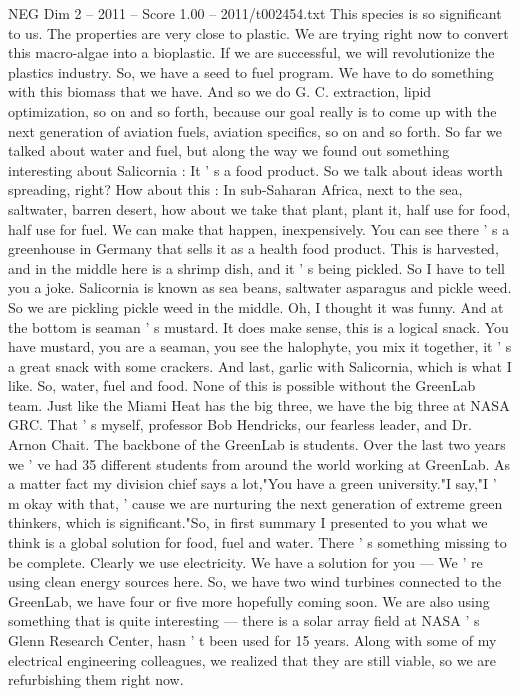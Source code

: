\begin{textsample}{NEG Dim 2 – 2011 – Score 1.00 – 2011/t002454.txt}
This species is so significant to us.
The properties are very close to plastic.
We are trying right now to convert this macro-algae into a bioplastic.
If we are successful, we will revolutionize the plastics industry.
So, we have a seed to fuel program.
We have to do something with this biomass that we have.
And so we do G.
C. extraction, lipid optimization, so on and so forth, because our goal really is to come up with the next generation of aviation fuels, aviation specifics, so on and so forth.
So far we talked about water and fuel, but along the way we found out something interesting about Salicornia : It ' s a food product.
So we talk about ideas worth spreading, right?
How about this : In sub-Saharan Africa, next to the sea, saltwater, barren desert, how about we take that plant, plant it, half use for food, half use for fuel.
We can make that happen, inexpensively.
You can see there ' s a greenhouse in Germany that sells it as a health food product.
This is harvested, and in the middle here is a shrimp dish, and it ' s being pickled.
So I have to tell you a joke.
Salicornia is known as sea beans, saltwater asparagus and pickle weed.
So we are pickling pickle weed in the middle.
Oh, I thought it was funny.
And at the bottom is seaman ' s mustard.
It does make sense, this is a logical snack.
You have mustard, you are a seaman, you see the halophyte, you mix it together, it ' s a great snack with some crackers.
And last, garlic with Salicornia, which is what I like.
So, water, fuel and food.
None of this is possible without the GreenLab team.
Just like the Miami Heat has the big three, we have the big three at NASA GRC.
That ' s myself, professor Bob Hendricks, our fearless leader, and Dr.
Arnon Chait.
The backbone of the GreenLab is students.
Over the last two years we ' ve had 35 different students from around the world working at GreenLab.
As a matter fact my division chief says a lot,"You have a green university."I say,"I ' m okay with that, ' cause we are nurturing the next generation of extreme green thinkers, which is significant."So, in first summary I presented to you what we think is a global solution for food, fuel and water.
There ' s something missing to be complete.
Clearly we use electricity.
We have a solution for you — We ' re using clean energy sources here.
So, we have two wind turbines connected to the GreenLab, we have four or five more hopefully coming soon.
We are also using something that is quite interesting — there is a solar array field at NASA ' s Glenn Research Center, hasn ' t been used for 15 years.
Along with some of my electrical engineering colleagues, we realized that they are still viable, so we are refurbishing them right now.

\end{textsample}
